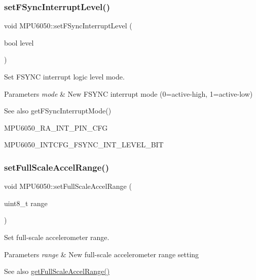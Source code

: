 \subsubsection{\texorpdfstring{setFSyncInterruptLevel()}{setFSyncInterruptLevel()}}
{\footnotesize\ttfamily void M\+P\+U6050\+::set\+F\+Sync\+Interrupt\+Level (\begin{DoxyParamCaption}\item[{bool}]{level }\end{DoxyParamCaption})}

Set F\+S\+Y\+NC interrupt logic level mode. 
\begin{DoxyParams}{Parameters}
{\em mode} & New F\+S\+Y\+NC interrupt mode (0=active-\/high, 1=active-\/low) \\
\hline
\end{DoxyParams}
\begin{DoxySeeAlso}{See also}
get\+F\+Sync\+Interrupt\+Mode() 

M\+P\+U6050\+\_\+\+R\+A\+\_\+\+I\+N\+T\+\_\+\+P\+I\+N\+\_\+\+C\+FG 

M\+P\+U6050\+\_\+\+I\+N\+T\+C\+F\+G\+\_\+\+F\+S\+Y\+N\+C\+\_\+\+I\+N\+T\+\_\+\+L\+E\+V\+E\+L\+\_\+\+B\+IT 
\end{DoxySeeAlso}
\mbox{\label{class_m_p_u6050_a64eb78e8e359c541beaf8664db3421d1}} 
\subsubsection{\texorpdfstring{setFullScaleAccelRange()}{setFullScaleAccelRange()}}
{\footnotesize\ttfamily void M\+P\+U6050\+::set\+Full\+Scale\+Accel\+Range (\begin{DoxyParamCaption}\item[{uint8\+\_\+t}]{range }\end{DoxyParamCaption})}

Set full-\/scale accelerometer range. 
\begin{DoxyParams}{Parameters}
{\em range} & New full-\/scale accelerometer range setting \\
\hline
\end{DoxyParams}
\begin{DoxySeeAlso}{See also}
\mbox{\hyperlink{class_m_p_u6050_a0fe2dad60c170cee7d614e08f243ffd0}{get\+Full\+Scale\+Accel\+Range()}} 
\end{DoxySeeAlso}
\mbox{\label{class_m_p_u6050_a72afc0b6f221c9336f635b5637c62dae}} 

